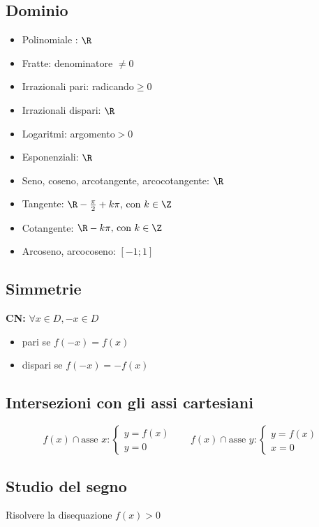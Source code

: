 \documentclass{article}     %
\begin{document}
    \subsection{Dominio}
    \begin{itemize}
        \item Polinomiale : $\R$
        \item Fratte: denominatore $\neq 0$
        \item Irrazionali pari: radicando$\geq0$
        \item Irrazionali dispari: $\R$
        \item Logaritmi: argomento$>0$
        \item Esponenziali: $\R$
        \item Seno, coseno, arcotangente, arcocotangente: $\R$
        \item Tangente: $\R -{\frac{\pi}{2}+k\pi}\text{, con } k\in\Z$
        \item Cotangente: $\R -{k\pi}\text{, con } k\in\Z$
        \item Arcoseno, arcocoseno: $[-1;1]$
    \end{itemize}
    \subsection{Simmetrie}
    \textbf{CN:} $\forall x \in D, -x \in D$
    \begin{itemize}
        \item pari se $f(-x)=f(x)$
        \item dispari se $f(-x)=-f(x)$
    \end{itemize}
    \subsection{Intersezioni con gli assi cartesiani}
    \[f(x) \cap \text{asse~}x : \left\{\begin{array}{l}
         y=f(x)  \\
         y=0 
    \end{array}\right.~~~~~~~~ 
    f(x) \cap \text{asse~}y : \left\{\begin{array}{l}
         y=f(x)  \\
         x=0 
    \end{array}\right.\] 
    \subsection{Studio del segno}
    Risolvere la disequazione $f(x)>0$
\end{document}
